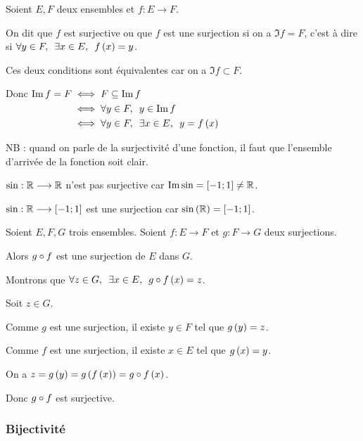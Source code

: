 \begin{defi}
Soient \(E,F\) deux ensembles et \(f:E\to F\).

On dit que \(f\) est surjective ou que \(f\) est une surjection si on a \(\Im f=F\), c'est à dire si \(\quantifs{\forall y\in F;\exists x\in E}f\paren{x}=y\).

Ces deux conditions sont équivalentes car on a \(\Im f\subset F\).

Donc \(\begin{aligned}[t]
\Im f=F&\iff F\subset\Im f \\
&\iff\quantifs{\forall y\in F}y\in\Im f \\
&\iff\quantifs{\forall y\in F;\exists x\in E}y=f\paren{x}
\end{aligned}\)

NB : quand on parle de la surjectivité d'une fonction, il faut que l'ensemble d'arrivée de la fonction soit clair.
\end{defi}

\begin{ex}
\(\sin:\mathbb{R}\longrightarrow\mathbb{R}\) n'est pas surjective car \(\operatorname{Im}\sin=\left[-1;1\right]\not=\mathbb{R}\).

\(\sin:\mathbb{R}\longrightarrow\left[-1;1\right]\) est une surjection car \(\sin\left(\mathbb{R}\right)=\left[-1;1\right]\).
\end{ex}

\begin{prop}
Soient \(E,F,G\) trois ensembles. Soient \(f:E\to F\) et \(g:F\to G\) deux surjections.

Alors \(g\circ f\) est une surjection de \(E\) dans \(G\).
\end{prop}

\begin{dem}
Montrons que \(\quantifs{\forall z\in G;\exists x\in E}g\rond f\paren{x}=z\).

Soit \(z\in G\).

Comme \(g\) est une surjection, il existe \(y\in F\) tel que \(g\left(y\right)=z\).

Comme \(f\) est une surjection, il existe \(x\in E\) tel que \(g\left(x\right)=y\).

On a \(z=g\left(y\right)=g\left(f\left(x\right)\right)=g\circ f\left(x\right)\).

Donc \(g\circ f\) est surjective.
\end{dem}

\subsubsection{Bijectivité}

